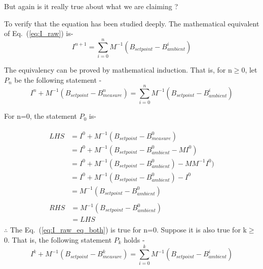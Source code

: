 


But again is it really true about what we are claiming ?

To verify that the equation has been studied deeply. The mathematical equivalent of Eq.~(\ref{eq:I_raw}) is- 
\begin{equation}\label{eq:I_raw_eq}
    I^{n+1}= \sum_{i=0}^n M^{-1} (B_{setpoint}-B_{ambient}^i)
\end{equation}

The equivalency can be proved by mathematical induction. That is, for n$\geq$0, let $P_n$ be the following statement -
\begin{equation}\label{eq:I_raw_eq_both}
   I^n+M^{-1} (B_{setpoint}-B_{measure}^n)= \sum_{i=0}^n M^{-1} (B_{setpoint}-B_{ambient}^i)
\end{equation}

For n=0, the statement $P_0$ is-

\begin{align*}
    \begin{split}
      LHS &=I^0+M^{-1} (B_{setpoint}-B_{measure}^0) \\
        &=I^0+M^{-1} (B_{setpoint}-B_{ambient}^0 -M I^0) \\
        &=I^0+M^{-1} (B_{setpoint}-B_{ambient}^0) - MM^{-1} I^0) \\
        &=I^0+M^{-1} (B_{setpoint}-B_{ambient}^0) - I^0 \\
        &=M^{-1} (B_{setpoint}-B_{ambient}^0)
    \end{split}
    \\
    \begin{split}
      RHS &=M^{-1} (B_{setpoint}-B_{ambient}^0)\\
          &= LHS
    \end{split}
\end{align*}
$\therefore$ The Eq.~(\ref{eq:I_raw_eq_both}) is true for n=0.\newline
Suppose it is also true for k$\geq$0. That is, the following statement $P_k$ holds -
\begin{equation}\label{eq:I_raw_99}
   I^k+M^{-1} (B_{setpoint}-B_{measure}^k)= \sum_{i=0}^k M^{-1} (B_{setpoint}-B_{ambient}^i)
\end{equation}

